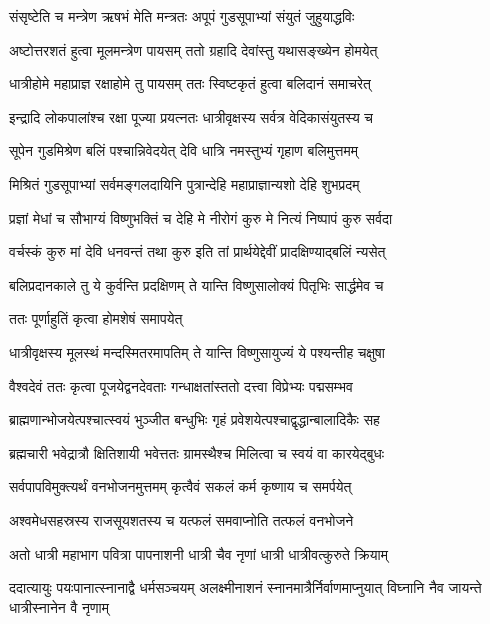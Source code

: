 \twolineshloka
{संसृष्टेति च मन्त्रेण ऋषभं मेति मन्त्रतः}
{अपूपं गुडसूपाभ्यां संयुतं जुहुयाद्धविः} %

\twolineshloka
{अष्टोत्तरशतं हुत्वा मूलमन्त्रेण पायसम्}
{ततो ग्रहादि देवांस्तु यथासङ्ख्येन होमयेत्} %

\twolineshloka
{धात्रीहोमे महाप्राज्ञ रक्षाहोमे तु पायसम्}
{ततः स्विष्टकृतं हुत्वा बलिदानं समाचरेत्} %

\twolineshloka
{इन्द्रादि लोकपालांश्च रक्षा पूज्या प्रयत्नतः}
{धात्रीवृक्षस्य सर्वत्र वेदिकासंयुतस्य च} %

\twolineshloka
{सूपेन गुडमिश्रेण बलिं पश्चान्निवेदयेत्}
{देवि धात्रि नमस्तुभ्यं गृहाण बलिमुत्तमम्} %

\twolineshloka
{मिश्रितं गुडसूपाभ्यां सर्वमङ्गलदायिनि}
{पुत्रान्देहि महाप्राज्ञान्यशो देहि शुभप्रदम्} %

\twolineshloka
{प्रज्ञां मेधां च सौभाग्यं विष्णुभक्तिं च देहि मे}
{नीरोगं कुरु मे नित्यं निष्पापं कुरु सर्वदा} %

\twolineshloka
{वर्चस्कं कुरु मां देवि धनवन्तं तथा कुरु}
{इति तां प्रार्थयेद्देवीं प्रादक्षिण्याद्बलिं न्यसेत्} %

\twolineshloka
{बलिप्रदानकाले तु ये कुर्वन्ति प्रदक्षिणम्}
{ते यान्ति विष्णुसालोक्यं पितृभिः सार्द्धमेव च} %


\onelineshloka
{ततः पूर्णाहुतिं कृत्वा होमशेषं समापयेत्} %

\twolineshloka
{धात्रीवृक्षस्य मूलस्थं मन्दस्मितरमापतिम्}
{ते यान्ति विष्णुसायुज्यं ये पश्यन्तीह चक्षुषा} %

\twolineshloka
{वैश्वदेवं ततः कृत्वा पूजयेद्वनदेवताः}
{गन्धाक्षतांस्ततो दत्त्वा विप्रेभ्यः पद्मसम्भव} %

\twolineshloka
{ब्राह्मणान्भोजयेत्पश्चात्स्वयं भुञ्जीत बन्धुभिः}
{गृहं प्रवेशयेत्पश्चाद्वृद्धान्बालादिकैः सह} %

\twolineshloka
{ब्रह्मचारी भवेद्रात्रौ क्षितिशायी भवेत्ततः}
{ग्रामस्थैश्च मिलित्वा च स्वयं वा कारयेद्बुधः} %

\twolineshloka
{सर्वपापविमुक्त्यर्थं वनभोजनमुत्तमम्}
{कृत्वैवं सकलं कर्म कृष्णाय च समर्पयेत्} %

\twolineshloka
{अश्वमेधसहस्रस्य राजसूयशतस्य च}
{यत्फलं समवाप्नोति तत्फलं वनभोजने} %

\twolineshloka
{अतो धात्री महाभाग पवित्रा पापनाशनी}
{धात्री चैव नृणां धात्री धात्रीवत्कुरुते क्रियाम्} %

\threelineshloka
{ददात्यायुः पयःपानात्स्नानाद्वै धर्मसञ्चयम्}
{अलक्ष्मीनाशनं स्नानमात्रैर्निर्वाणमाप्नुयात्}
{विघ्नानि नैव जायन्ते धात्रीस्नानेन वै नृणाम्} %

